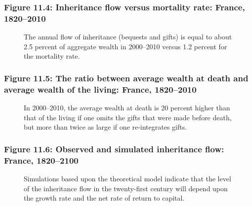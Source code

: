 \documentclass[t]{beamer}\usepackage[]{graphicx}\usepackage[]{color}
\begin{document}
\begin{frame}[label=Figure_11_4]
\frametitle{Figure 11.4: Inheritance flow versus mortality rate: France, 1820--2010}
\begin{figure}[t]
\begin{minipage}[b]{\textwidth}
\centering

\caption{The annual flow of inheritance (bequests and gifts) is equal to about 2.5 percent of aggregate wealth in 2000--2010 versus 1.2 percent for the mortality rate.}
\end{minipage}
\end{figure}
\end{frame}


\begin{frame}[label=Figure_11_5]
\frametitle{Figure 11.5: The ratio between average wealth at death and average wealth of the living: France, 1820--2010}
\begin{figure}[t]
\begin{minipage}[b]{\textwidth}
\centering

\caption{In 2000--2010, the average wealth at death is 20 percent higher than that of the living if one omits the gifts that were made before death, but more than twice as large if one re-integrates gifts.}
\end{minipage}
\end{figure}
\end{frame}


\begin{frame}[label=Figure_11_6]
\frametitle{Figure 11.6: Observed and simulated inheritance flow: France, 1820--2100}
\begin{figure}[t]
\begin{minipage}[b]{\textwidth}
\centering

\caption{Simulations based upon the theoretical model indicate that the level of the inheritance flow in the twenty-first century will depend upon the growth rate and the net rate of return to capital.}
\end{minipage}
\end{figure}
\end{frame}
\end{document}
